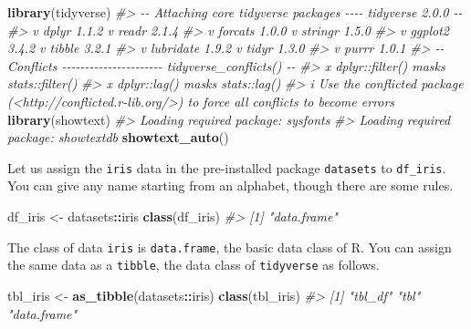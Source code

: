 \documentclass[
  xelatex, ja=standard]{bxjsbook}
\newenvironment{Shaded}{\begin{snugshade}}{\end{snugshade}}
\newcommand{\CommentTok}[1]{\textcolor[rgb]{0.56,0.35,0.01}{\textit{#1}}}
\newcommand{\FunctionTok}[1]{\textcolor[rgb]{0.13,0.29,0.53}{\textbf{#1}}}
\newcommand{\NormalTok}[1]{#1}
\newcommand{\OtherTok}[1]{\textcolor[rgb]{0.56,0.35,0.01}{#1}}
\newcommand{\SpecialCharTok}[1]{\textcolor[rgb]{0.81,0.36,0.00}{\textbf{#1}}}
\theoremstyle{definition}
\theoremstyle{definition}
\theoremstyle{definition}
\theoremstyle{definition}
\theoremstyle{remark}
\begin{document}
\begin{Shaded}
\begin{Highlighting}[]
\FunctionTok{library}\NormalTok{(tidyverse)}
\CommentTok{\#\textgreater{} {-}{-} Attaching core tidyverse packages {-}{-}{-}{-} tidyverse 2.0.0 {-}{-}}
\CommentTok{\#\textgreater{} v dplyr     1.1.2     v readr     2.1.4}
\CommentTok{\#\textgreater{} v forcats   1.0.0     v stringr   1.5.0}
\CommentTok{\#\textgreater{} v ggplot2   3.4.2     v tibble    3.2.1}
\CommentTok{\#\textgreater{} v lubridate 1.9.2     v tidyr     1.3.0}
\CommentTok{\#\textgreater{} v purrr     1.0.1     }
\CommentTok{\#\textgreater{} {-}{-} Conflicts {-}{-}{-}{-}{-}{-}{-}{-}{-}{-}{-}{-}{-}{-}{-}{-}{-}{-}{-}{-}{-}{-} tidyverse\_conflicts() {-}{-}}
\CommentTok{\#\textgreater{} x dplyr::filter() masks stats::filter()}
\CommentTok{\#\textgreater{} x dplyr::lag()    masks stats::lag()}
\CommentTok{\#\textgreater{} i Use the conflicted package (\textless{}http://conflicted.r{-}lib.org/\textgreater{}) to force all conflicts to become errors}
\FunctionTok{library}\NormalTok{(showtext) }
\CommentTok{\#\textgreater{} Loading required package: sysfonts}
\CommentTok{\#\textgreater{} Loading required package: showtextdb}
\FunctionTok{showtext\_auto}\NormalTok{()}
\end{Highlighting}
\end{Shaded}

Let us assign the \texttt{iris} data in the pre-installed package \texttt{datasets} to \texttt{df\_iris}. You can give any name starting from an alphabet, though there are some rules.

\begin{Shaded}
\begin{Highlighting}[]
\NormalTok{df\_iris }\OtherTok{\textless{}{-}}\NormalTok{ datasets}\SpecialCharTok{::}\NormalTok{iris}
\FunctionTok{class}\NormalTok{(df\_iris)}
\CommentTok{\#\textgreater{} [1] "data.frame"}
\end{Highlighting}
\end{Shaded}

The class of data \texttt{iris} is \texttt{data.frame}, the basic data class of R. You can assign the same data as a \texttt{tibble}, the data class of \texttt{tidyverse} as follows.

\begin{Shaded}
\begin{Highlighting}[]
\NormalTok{tbl\_iris }\OtherTok{\textless{}{-}} \FunctionTok{as\_tibble}\NormalTok{(datasets}\SpecialCharTok{::}\NormalTok{iris)}
\FunctionTok{class}\NormalTok{(tbl\_iris)}
\CommentTok{\#\textgreater{} [1] "tbl\_df"     "tbl"        "data.frame"}
\end{Highlighting}
\end{Shaded}
\end{document}
